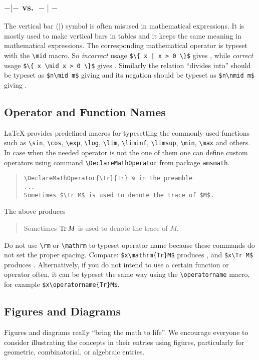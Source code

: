 \subsubsection{${-}|{-}$ vs.\ ${-}\mid{-}$}
The vertical bar ($|$) symbol is often misused in mathematical expressions.
It is mostly used to make vertical bars in tables and it keeps the same
meaning in mathematical expressions. The corresponding mathematical operator is
typeset with the \verb|\mid| macro. So \emph{incorrect} usage
\verb"$\{ x | x > 0 \}$" gives , while \emph{correct}
usage \verb|$\{ x \mid x > 0 \}$| gives . Similarly the relation ``divides into'' should be typeset as \verb"$n\mid m$" giving  and its negation should be typeset as \verb"$n\nmid m$" giving .


\subsection{Operator and Function Names}
\LaTeX{} provides predefined macros for typesetting the commonly used functions such as \verb|\sin|, \verb|\cos|, \verb|\exp|, \verb|\log|, \verb|\lim|, \verb|\liminf|, \verb|\limsup|, \verb|\min|, \verb|\max| and others. In case when the needed operator is not the one of them one can define custom operators using command \verb|\DeclareMathOperator| from package \texttt{amsmath}.
\begin{quote}
\begin{verbatim}
\DeclareMathOperator{\Tr}{Tr} % in the preamble
...
Sometimes $\Tr M$ is used to denote the trace of $M$.
\end{verbatim}
\end{quote}
The above produces
\begin{quote}
Sometimes $\Tr M$ is used to denote the trace of $M$.
\end{quote}

Do not use \verb|\rm| or \verb|\mathrm| to typeset operator name because these commands do not set the proper spacing. Compare: \verb|$x\mathrm{Tr}M$| produces , and \verb|$x\Tr M$| produces .
Alternatively, if you do not intend to use a certain function or operator
often, it can be typeset the same way using the \verb|\operatorname| macro,
for example \verb|$x\operatorname{Tr}M$|.

\subsection{Figures and Diagrams}
Figures and diagrams really ``bring the math to life''. We encourage
everyone to consider illustrating the concepts in their entries
using figures, particularly for geometric, combinatorial, or algebraic
entries.

